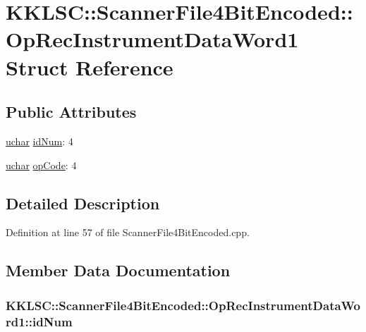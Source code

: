 \hypertarget{struct_scanner_file4_bit_encoded_1_1_op_rec_instrument_data_word1}{}\section{K\+K\+L\+SC\+:\+:Scanner\+File4\+Bit\+Encoded\+:\+:Op\+Rec\+Instrument\+Data\+Word1 Struct Reference}
\label{struct_scanner_file4_bit_encoded_1_1_op_rec_instrument_data_word1}
\subsection*{Public Attributes}
\begin{DoxyCompactItemize}
\item 
\hyperlink{namespace_k_k_b_ace9969169bf514f9ee6185186949cdf7}{uchar} \hyperlink{struct_scanner_file4_bit_encoded_1_1_op_rec_instrument_data_word1_a9a5f21560b2ab1da27c5bb49bde94c10}{id\+Num}\+: 4
\item 
\hyperlink{namespace_k_k_b_ace9969169bf514f9ee6185186949cdf7}{uchar} \hyperlink{struct_scanner_file4_bit_encoded_1_1_op_rec_instrument_data_word1_ab40058bc2a010ec87640c2d56f698e4f}{op\+Code}\+: 4
\end{DoxyCompactItemize}


\subsection{Detailed Description}


Definition at line 57 of file Scanner\+File4\+Bit\+Encoded.\+cpp.



\subsection{Member Data Documentation}
\subsubsection[{\texorpdfstring{id\+Num}{idNum}}]{ K\+K\+L\+S\+C\+::\+Scanner\+File4\+Bit\+Encoded\+::\+Op\+Rec\+Instrument\+Data\+Word1\+::id\+Num}\hypertarget{struct_scanner_file4_bit_encoded_1_1_op_rec_instrument_data_word1_a9a5f21560b2ab1da27c5bb49bde94c10}{}\label{struct_scanner_file4_bit_encoded_1_1_op_rec_instrument_data_word1_a9a5f21560b2ab1da27c5bb49bde94c10}


